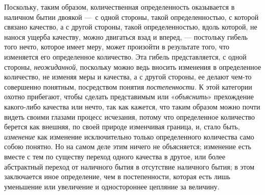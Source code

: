Поскольку, таким образом, количественная определенность оказывается в
наличном бытии двоякой —~с одной стороны, такой определенностью, с которой
связано качество, а с другой стороны, такой определенностью, вдоль которой,
не нанося ущерба качеству, можно двигаться взад и вперед, — постольку
гибель того нечто, которое имеет меру, может произойти в результате того,
что изменяется его определенное количество. Эта гибель представляется, с
одной стороны, {\em неожиданной}, поскольку можно ведь
вносить изменения в определенное количество, не изменяя меры и качества, а
с другой стороны, ее делают чем-то совершенно понятным, посредством понятия
{\em постепенности}. К этой категории охотно
прибегают, чтобы сделать представимым или
«{\em объяснить}» прехождение какого-либо качества или
нечто, так как кажется, что таким образом можно почти видеть своими глазами
процесс исчезания, потому что определенное количество берется как внешняя,
по своей природе изменчивая граница, и, стало быть,
{\em изменение} как изменение исключительно только
определенного количества само собою понятно. Но на самом деле этим ничего
не объясняется; изменение есть вместе с тем по существу переход одного
качества в другое, или более абстрактный переход от наличного бытия в
отсутствие наличного бытия; в этом заключается иное определение, чем в
постепенности, которая есть лишь уменьшение или увеличение и одностороннее
цепляние за величину.

